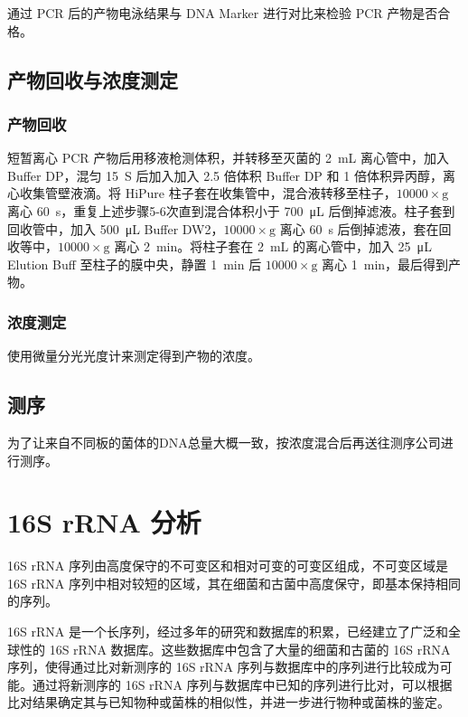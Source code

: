 \documentclass{ctexart}
\begin{document}
    \qquad 通过 PCR 后的产物电泳结果与 DNA Marker 进行对比来检验 PCR 产物是否合格。

    \subsection{产物回收与浓度测定}
    \subsubsection{产物回收}
    \qquad 短暂离心 PCR 产物后用移液枪测体积，并转移至灭菌的 2~mL 离心管中，加入 Buffer DP，混匀 15~S 后加入加入 2.5 倍体积 Buffer DP 和 1 倍体积异丙醇，离心收集管壁液滴。将 HiPure 柱子套在收集管中，混合液转移至柱子，$\mathrm{10000\times g}$ 离心 60~s，重复上述步骤5-6次直到混合体积小于 700~μL 后倒掉滤液。柱子套到回收管中，加入 500~μL Buffer DW2，$\mathrm{10000\times g}$ 离心 60~s 后倒掉滤液，套在回收等中，$\mathrm{10000\times g}$ 离心 2~min。将柱子套在 2~mL 的离心管中，加入 25~μL Elution Buff 至柱子的膜中央，静置 1~min 后 $\mathrm{10000\times g}$ 离心 1~min，最后得到产物。
    \subsubsection{浓度测定}
    \qquad 使用微量分光光度计来测定得到产物的浓度。
    \subsection{测序}
    \qquad 为了让来自不同板的菌体的DNA总量大概一致，按浓度混合后再送往测序公司进行测序。

    \section{16S rRNA 分析}
    \qquad 16S rRNA 序列由高度保守的不可变区和相对可变的可变区组成，不可变区域是 16S rRNA 序列中相对较短的区域，其在细菌和古菌中高度保守，即基本保持相同的序列。
    
    \qquad 16S rRNA 是一个长序列，经过多年的研究和数据库的积累，已经建立了广泛和全球性的 16S rRNA 数据库。这些数据库中包含了大量的细菌和古菌的 16S rRNA 序列，使得通过比对新测序的 16S rRNA 序列与数据库中的序列进行比较成为可能。通过将新测序的 16S rRNA 序列与数据库中已知的序列进行比对，可以根据比对结果确定其与已知物种或菌株的相似性，并进一步进行物种或菌株的鉴定。
\end{document}

